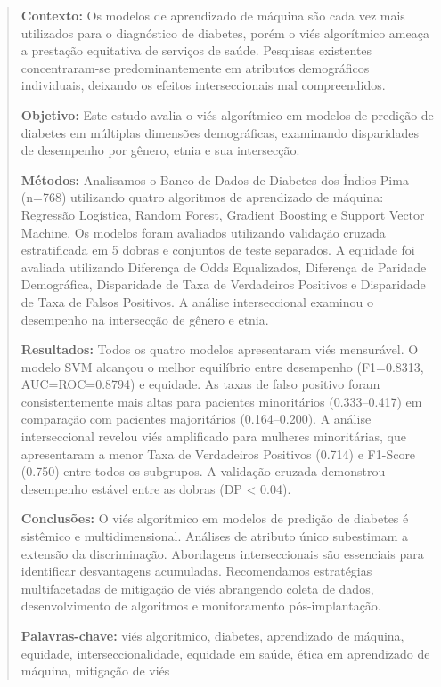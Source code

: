 
\begin{abstract}
\noindent
\textbf{Contexto:} Os modelos de aprendizado de máquina são cada vez mais 
utilizados para o diagnóstico de diabetes, porém o viés algorítmico ameaça 
a prestação equitativa de serviços de saúde. Pesquisas existentes concentraram-se 
predominantemente em atributos demográficos individuais, deixando os efeitos 
interseccionais mal compreendidos.

\textbf{Objetivo:} Este estudo avalia o viés algorítmico em modelos de 
predição de diabetes em múltiplas dimensões demográficas, examinando 
disparidades de desempenho por gênero, etnia e sua intersecção.

\textbf{Métodos:} Analisamos o Banco de Dados de Diabetes dos Índios Pima 
(n=768) utilizando quatro algoritmos de aprendizado de máquina: Regressão 
Logística, Random Forest, Gradient Boosting e Support Vector Machine. Os 
modelos foram avaliados utilizando validação cruzada estratificada em 5 
dobras e conjuntos de teste separados. A equidade foi avaliada utilizando 
Diferença de Odds Equalizados, Diferença de Paridade Demográfica, Disparidade 
de Taxa de Verdadeiros Positivos e Disparidade de Taxa de Falsos Positivos. 
A análise interseccional examinou o desempenho na intersecção de gênero 
e etnia.

\textbf{Resultados:} Todos os quatro modelos apresentaram viés mensurável. 
O modelo SVM alcançou o melhor equilíbrio entre desempenho (F1=0.8313, 
AUC=ROC=0.8794) e equidade. As taxas de falso positivo foram 
consistentemente mais altas para pacientes minoritários (0.333--0.417) 
em comparação com pacientes majoritários (0.164--0.200). A análise 
interseccional revelou viés amplificado para mulheres minoritárias, que 
apresentaram a menor Taxa de Verdadeiros Positivos (0.714) e F1-Score 
(0.750) entre todos os subgrupos. A validação cruzada demonstrou desempenho 
estável entre as dobras (DP < 0.04).

\textbf{Conclusões:} O viés algorítmico em modelos de predição de diabetes 
é sistêmico e multidimensional. Análises de atributo único subestimam a 
extensão da discriminação. Abordagens interseccionais são essenciais para 
identificar desvantagens acumuladas. Recomendamos estratégias multifacetadas 
de mitigação de viés abrangendo coleta de dados, desenvolvimento de 
algoritmos e monitoramento pós-implantação.

\noindent
\textbf{Palavras-chave:} viés algorítmico, diabetes, aprendizado de máquina, 
equidade, interseccionalidade, equidade em saúde, ética em aprendizado 
de máquina, mitigação de viés
\end{abstract}
